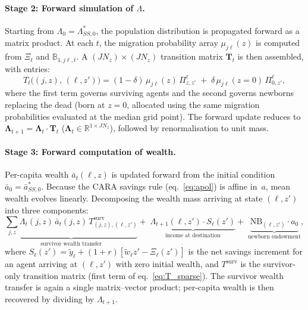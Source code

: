 \documentclass[11pt, a4paper]{article}
\begin{document}
\paragraph{Stage 2: Forward simulation of $\Lambda$.}
Starting from $\Lambda_0 = \Lambda^*_{SS,0}$, the population distribution is propagated forward as a matrix product. At each $t$, the migration probability array $\mu_{j\ell}(z)$ is computed from $\Xi_t$ and $\mathbb{B}_{1,j\ell,t}$. A  $(JN_z)\times(JN_z)$ transition matrix $\mathbf{T}_t$ is then assembled, with entries:
\begin{equation}
  T_t\bigl((j,z),\,(\ell,z')\bigr)
  = (1-\delta)\,\mu_{j\ell}(z)\,\Pi^\ell_{z,z'}
  \;+\;\delta\,\mu_{j\ell}(z{=}0)\,\Pi^\ell_{0,z'},
  \label{eq:T_sparse}
\end{equation}
where the first term governs surviving agents and the second governs newborns replacing the dead (born at $z=0$, allocated using the same migration probabilities evaluated at the median grid point). The forward update reduces to $\boldsymbol{\Lambda}_{t+1} = \boldsymbol{\Lambda}_t \cdot \mathbf{T}_t$ ($\boldsymbol{\Lambda}_t \in \mathbb{R}^{1 \times JN_z}$), followed by renormalisation to unit mass.

\paragraph{Stage 3: Forward computation of wealth.}
Per-capita wealth $\bar a_t(\ell,z)$ is updated forward from the initial condition $\bar a_0 = \bar a^*_{SS,0}$. Because the CARA savings rule (eq.~\ref{eq:apol}) is affine in~$a$, mean wealth evolves linearly. Decomposing the wealth mass arriving at state $(\ell, z')$ into three components:
\begin{equation}
  \underbrace{\sum_{j,z}\Lambda_t(j,z)\,\bar a_t(j,z)\,T^{\mathrm{surv}}_{(j,z),(\ell,z')}}_{\text{survivor wealth transfer}}
  +\;\underbrace{\Lambda_{t+1}(\ell,z')\cdot S_\ell(z')}_{\text{income at destination}}
  +\;\underbrace{\text{NB}_{(\ell,z')}\cdot a_0}_{\text{newborn endowment}},
  \label{eq:a_bar_update}
\end{equation}
where $S_\ell(z') = \tilde y_\ell + (1{+}r)[\tilde w_\ell z' - \Xi_\ell(z')]$ is the net savings increment for an agent arriving at $(\ell,z')$ with zero initial wealth, and $T^{\mathrm{surv}}$ is the survivor-only transition matrix (first term of eq.~\ref{eq:T_sparse}). The survivor wealth transfer is again a single matrix--vector product; per-capita wealth is then recovered by dividing by $\Lambda_{t+1}$.
\end{document}

